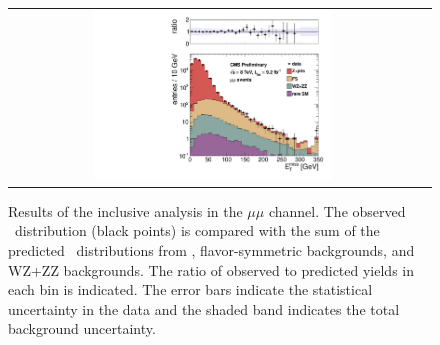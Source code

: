 \clearpage

\begin{figure}[!h]
\begin{center}
\begin{tabular}{cc}
\includegraphics[width=0.6\textwidth]{plots/pfmet_mm.pdf}
\end{tabular}
\caption{Results of the inclusive analysis in the $\mu\mu$ channel. The observed \MET\ distribution (black points) is compared with the sum of the predicted \MET\
distributions from \zjets, flavor-symmetric backgrounds, and WZ+ZZ backgrounds. The ratio of observed to predicted yields in each bin is
indicated. The error bars indicate the statistical uncertainty in the data and the shaded band indicates the total background uncertainty.
\label{fig:results_incl_mm}
}
\end{center}
\end{figure}

